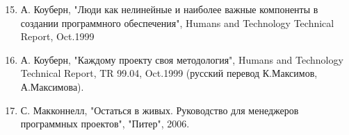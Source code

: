 \documentclass{beamer}
\begin{document}
\begin{frame}   
\begin{enumerate}
\setcounter{enumi}{14}
\item А. Коуберн, "Люди как нелинейные и наиболее важные компоненты в создании программного обеспечения", Humans and Technology Technical Report, Oct.1999
\item А. Коуберн, "Каждому проекту своя методология", Humans and Technology Technical Report, TR 99.04, Oct.1999 (русский перевод К.Максимов, А.Максимова).
\item С. Макконнелл, "Остаться в живых. Руководство для менеджеров программных проектов", "Питер", 2006.
\end{enumerate}
\end{frame}
\end{document}
